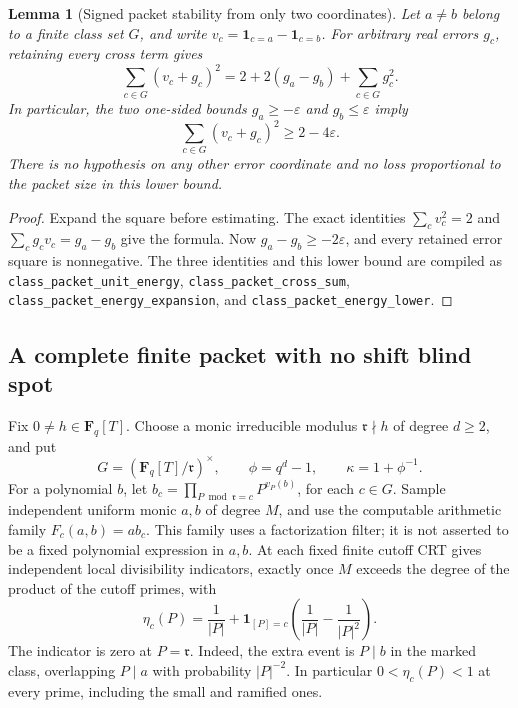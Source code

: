 \documentclass[11pt]{article}
\newtheorem{lemma}[theorem]{Lemma}
\newcommand{\F}{\mathbf F}
\begin{document}
\begin{lemma}[Signed packet stability from only two coordinates]
\label{lem:packetSignedStability}
Let \(a\ne b\) belong to a finite class set \(G\), and write
\(v_c=\mathbf1_{c=a}-\mathbf1_{c=b}\).
For arbitrary real errors \(g_c\), retaining every cross term gives
\[
 \sum_{c\in G}(v_c+g_c)^2
    =2+2(g_a-g_b)+\sum_{c\in G}g_c^2.
\]
In particular, the two one-sided bounds \(g_a\geq-\varepsilon\) and
\(g_b\leq\varepsilon\) imply
\[
                  \sum_{c\in G}(v_c+g_c)^2\geq2-4\varepsilon.
\]
There is no hypothesis on any other error coordinate and no loss
proportional to the packet size in this lower bound.
\end{lemma}
\begin{proof}
Expand the square before estimating. The exact identities
\(\sum_c v_c^2=2\) and \(\sum_c g_cv_c=g_a-g_b\) give the formula.
Now \(g_a-g_b\geq-2\varepsilon\), and every retained error square
is nonnegative. The three identities and this lower bound are
compiled as \texttt{class\_packet\_unit\_energy},
\texttt{class\_packet\_cross\_sum},
\texttt{class\_packet\_energy\_expansion}, and
\texttt{class\_packet\_energy\_lower}.
\end{proof}

\subsection{A complete finite packet with no shift blind spot}
Fix \(0\ne h\in\F_q[T]\). Choose a monic irreducible modulus
\(\mathfrak r\nmid h\) of degree \(d\geq2\), and put
\[
 G=(\F_q[T]/\mathfrak r)^\times,\qquad
 \phi=q^d-1,\qquad \kappa=1+\phi^{-1}.
\]
For a polynomial \(b\), let
\(b_c=\prod_{P\bmod\mathfrak r=c}P^{v_P(b)}\), for each \(c\in G\).
Sample independent uniform monic \(a,b\) of degree \(M\), and use the
computable arithmetic family \(F_c(a,b)=a b_c\). This family uses a
factorization filter; it is not asserted to be a fixed polynomial
expression in \(a,b\). At each fixed finite cutoff CRT gives independent
local divisibility indicators, exactly once \(M\) exceeds the degree
of the product of the cutoff primes, with
\begin{equation}\label{eq:classCarrierProbability}
 \eta_c(P)=\frac1{|P|}
       +\mathbf1_{[P]=c}\left(\frac1{|P|}-\frac1{|P|^2}\right).
\end{equation}
The indicator is zero at \(P=\mathfrak r\).
Indeed, the extra event is \(P\mid b\) in the marked class, overlapping
\(P\mid a\) with probability \(|P|^{-2}\). In particular
\(0<\eta_c(P)<1\) at every prime, including the small and ramified ones.
\end{document}
